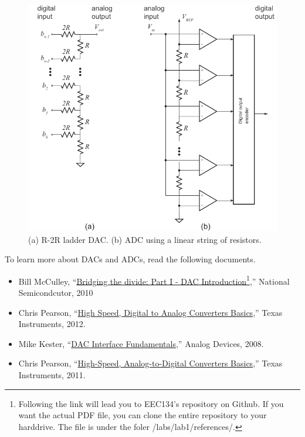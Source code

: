\documentclass[letterpaper, 11pt]{article}
\begin{document}
\begin{figure}[h]
	\centering
	\includegraphics{dac-adc}
	\caption{(a) R-2R ladder DAC. (b) ADC using a linear string of resistors.}
	\label{fig:dac-adc}
\end{figure}


To learn more about DACs and ADCs, read the following documents. 

\begin{itemize}[itemsep=0.1ex]
	\item Bill McCulley, ``\href{https://github.com/ucdart/UCD-EEC134/blob/c58efc438dba2679658333c34c4a6f733f594b39/labs/lab1/references/%5BMcCulley2010%5D.DAC.Introduction.pdf}{Bridging the divide: Part I - DAC Introduction}\footnote{Following the link  will lead you to EEC134's repository on Github. If you want the actual PDF file, you can clone the entire repository to your harddrive. The file is under the foler /labs/lab1/references/.},'' National Semicondcutor, 2010
	\item Chris Pearson, ``\href{https://github.com/ucdart/UCD-EEC134/blob/e977e88aaaf67f53cd562d2a071746a38ea19aa3/labs/lab1/references/%5BPearson2012%5D.High.Speed.Analog.to.Digital.Converters.Basics.pdf}{High Speed, Digital to Analog Converters Basics},'' Texas Instruments, 2012.
	\item Mike Kester, ``\href{http://www.analog.com/media/en/training-seminars/tutorials/MT-019.pdf}{DAC Interface Fundamentals},'' Analog Devices, 2008.
	\item Chris Pearson,  ``\href{https://github.com/ucdart/UCD-EEC134/blob/da59c17c776faf159aaea506ebd87510907dc133/labs/lab1/references/%5BPearson2011%5D.High-Speed.Analog-to-Digital.Converter.Basics.pdf}{High-Speed, Analog-to-Digital Converters Basics},'' Texas Instruments, 2011.
\end{itemize}
\end{document}
